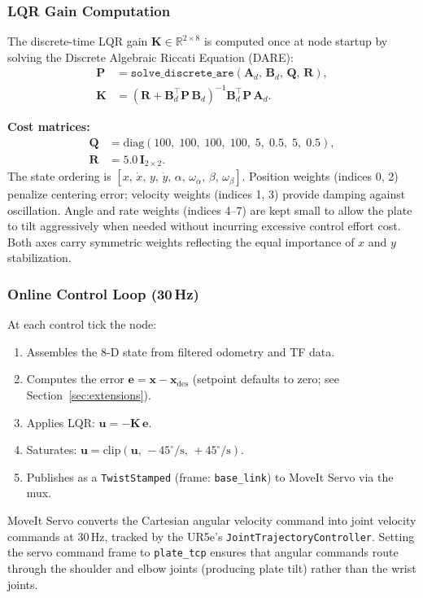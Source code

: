 \documentclass[journal]{IEEEtran}
\begin{document}
\subsubsection{LQR Gain Computation}
The discrete-time LQR gain $\mathbf{K} \in \mathbb{R}^{2\times 8}$ is computed once at node startup by
solving the Discrete Algebraic Riccati Equation (DARE):
%
\begin{align}
  \mathbf{P} &= \texttt{solve\_discrete\_are}(\mathbf{A}_d,\,\mathbf{B}_d,\,\mathbf{Q},\,\mathbf{R}),
  \label{eq:dare} \\
  \mathbf{K} &= (\mathbf{R} + \mathbf{B}_d^\top \mathbf{P}\, \mathbf{B}_d)^{-1}
                 \mathbf{B}_d^\top \mathbf{P}\, \mathbf{A}_d.
\end{align}

\noindent\textbf{Cost matrices:}
%
\begin{align}
  \mathbf{Q} &= \mathrm{diag}(100,\;100,\;100,\;100,\;5,\;0.5,\;5,\;0.5), \label{eq:Q} \\
  \mathbf{R} &= 5.0\,\mathbf{I}_{2\times 2}. \label{eq:R}
\end{align}
%
The state ordering is $[x,\,\dot{x},\,y,\,\dot{y},\,\alpha,\,\omega_\alpha,\,\beta,\,\omega_\beta]$.
Position weights (indices 0, 2) penalize centering error; velocity weights (indices 1, 3) provide
damping against oscillation. Angle and rate weights (indices 4--7) are kept small to allow the plate
to tilt aggressively when needed without incurring excessive control effort cost. Both axes carry
symmetric weights reflecting the equal importance of $x$ and $y$ stabilization.

\subsubsection{Online Control Loop (30\,Hz)}
At each control tick the node:
\begin{enumerate}
  \item Assembles the 8-D state from filtered odometry and TF data.
  \item Computes the error $\mathbf{e} = \mathbf{x} - \mathbf{x}_\mathrm{des}$ (setpoint defaults to zero;
    see Section~\ref{sec:extensions}).
  \item Applies LQR: $\mathbf{u} = -\mathbf{K}\,\mathbf{e}$.
  \item Saturates: $\mathbf{u} = \mathrm{clip}(\mathbf{u},\,-45^\circ/\mathrm{s},\,+45^\circ/\mathrm{s})$.
  \item Publishes as a \texttt{TwistStamped} (frame: \texttt{base\_link}) to MoveIt Servo via the mux.
\end{enumerate}
MoveIt Servo converts the Cartesian angular velocity command into joint velocity commands at 30\,Hz,
tracked by the UR5e's \texttt{JointTrajectoryController}. Setting the servo command frame to
\texttt{plate\_tcp} ensures that angular commands route through the shoulder and elbow joints (producing
plate tilt) rather than the wrist joints.
\end{document}

